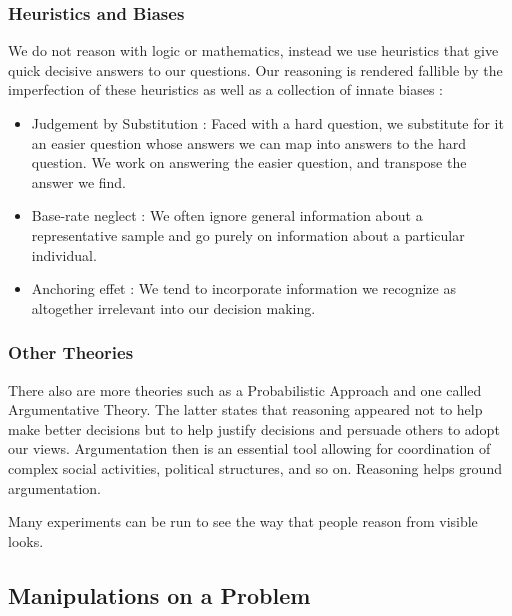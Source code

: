 \documentclass{cours}
\begin{document}
\subsubsection{Heuristics and Biases}
We do not reason with logic or mathematics, instead we use heuristics that give quick decisive answers to our questions. Our reasoning is rendered fallible by the imperfection of these heuristics as well as a collection of innate biases :
\begin{itemize}
    \item Judgement by Substitution : Faced with a hard question, we substitute for it an easier question whose answers we can map into answers to the hard question. We work on answering the easier question, and transpose the answer we find.
    \item Base-rate neglect : We often ignore general information about a representative sample and go purely on information about a particular individual.
    \item Anchoring effet : We tend to incorporate information we recognize as altogether irrelevant into our decision making.
\end{itemize}

\subsubsection{Other Theories}
There also are more theories such as a Probabilistic Approach and one called Argumentative Theory. The latter states that reasoning appeared not to help make better decisions but to help justify decisions and persuade others to adopt our views. Argumentation then is an essential tool allowing for coordination of complex social activities, political structures, and so on. Reasoning helps ground argumentation.


Many experiments can be run to see the way that people reason from visible looks.

\subsection{Manipulations on a Problem}
\end{document}
